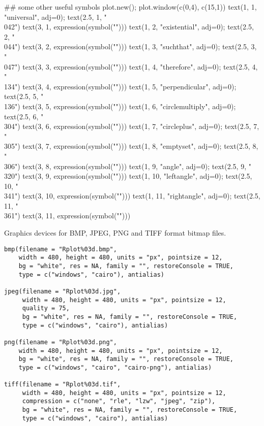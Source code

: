 \begin{Examples}
\begin{ExampleCode}
## some other useful symbols
plot.new(); plot.window(c(0,4), c(15,1))
text(1, 1, "universal", adj=0); text(2.5, 1,  "\\042")
text(3, 1, expression(symbol("")))
text(1, 2, "existential", adj=0); text(2.5, 2,  "\\044")
text(3, 2, expression(symbol("")))
text(1, 3, "suchthat", adj=0); text(2.5, 3,  "\\047")
text(3, 3, expression(symbol("")))
text(1, 4, "therefore", adj=0); text(2.5, 4,  "\\134")
text(3, 4, expression(symbol("")))
text(1, 5, "perpendicular", adj=0); text(2.5, 5,  "\\136")
text(3, 5, expression(symbol("")))
text(1, 6, "circlemultiply", adj=0); text(2.5, 6,  "\\304")
text(3, 6, expression(symbol("")))
text(1, 7, "circleplus", adj=0); text(2.5, 7,  "\\305")
text(3, 7, expression(symbol("")))
text(1, 8, "emptyset", adj=0); text(2.5, 8,  "\\306")
text(3, 8, expression(symbol("")))
text(1, 9, "angle", adj=0); text(2.5, 9,  "\\320")
text(3, 9, expression(symbol("")))
text(1, 10, "leftangle", adj=0); text(2.5, 10,  "\\341")
text(3, 10, expression(symbol("")))
text(1, 11, "rightangle", adj=0); text(2.5, 11,  "\\361")
text(3, 11, expression(symbol("")))
\end{ExampleCode}
\end{Examples}
%
\begin{Description}\relax
Graphics devices for BMP, JPEG, PNG and TIFF format bitmap files.
\end{Description}
%
\begin{Usage}
\begin{verbatim}
bmp(filename = "Rplot%03d.bmp",
    width = 480, height = 480, units = "px", pointsize = 12,
    bg = "white", res = NA, family = "", restoreConsole = TRUE,
    type = c("windows", "cairo"), antialias)

jpeg(filename = "Rplot%03d.jpg",
     width = 480, height = 480, units = "px", pointsize = 12,
     quality = 75,
     bg = "white", res = NA, family = "", restoreConsole = TRUE,
     type = c("windows", "cairo"), antialias)

png(filename = "Rplot%03d.png",
    width = 480, height = 480, units = "px", pointsize = 12,
    bg = "white", res = NA, family = "", restoreConsole = TRUE,
    type = c("windows", "cairo", "cairo-png"), antialias)

tiff(filename = "Rplot%03d.tif",
     width = 480, height = 480, units = "px", pointsize = 12,
     compression = c("none", "rle", "lzw", "jpeg", "zip"),
     bg = "white", res = NA, family = "", restoreConsole = TRUE,
     type = c("windows", "cairo"), antialias)
\end{verbatim}
\end{Usage}
